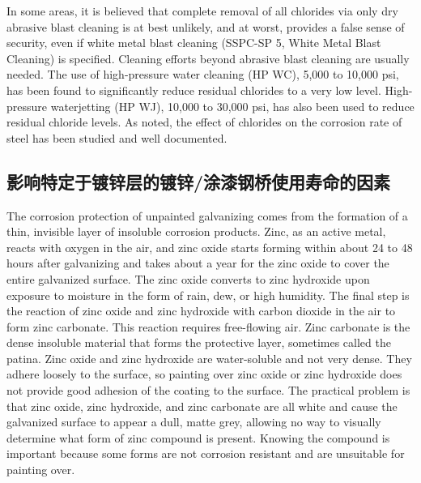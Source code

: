 In some areas, it is believed that complete removal of all chlorides via only dry abrasive blast cleaning is at best
unlikely, and at worst, provides a false sense of security, even if white metal blast cleaning (SSPC-SP 5, White
Metal Blast Cleaning) is specified. Cleaning efforts beyond abrasive blast cleaning are usually needed. The use of
high-pressure water cleaning (HP WC), 5,000 to 10,000 psi, has been found to significantly reduce residual chlorides
to a very low level. High-pressure waterjetting (HP WJ), 10,000 to 30,000 psi, has also been used to reduce residual
chloride levels. As noted, the effect of chlorides on the corrosion rate of steel has been studied and well documented.

\subsection{影响特定于镀锌层的镀锌/涂漆钢桥使用寿命的因素}
The corrosion protection of unpainted galvanizing comes from the formation of a thin, invisible layer of
insoluble corrosion products. Zinc, as an active metal, reacts with oxygen in the air, and zinc oxide starts forming
within about 24 to 48 hours after galvanizing and takes about a year for the zinc oxide to cover the entire galvanized
surface. The zinc oxide converts to zinc hydroxide upon exposure to moisture in the form of rain, dew, or high
humidity. The final step is the reaction of zinc oxide and zinc hydroxide with carbon dioxide in the air to form zinc
carbonate. This reaction requires free-flowing air. Zinc carbonate is the dense insoluble material that forms the
protective layer, sometimes called the patina. Zinc oxide and zinc hydroxide are water-soluble and not very dense.
They adhere loosely to the surface, so painting over zinc oxide or zinc hydroxide does not provide good adhesion of
the coating to the surface. The practical problem is that zinc oxide, zinc hydroxide, and zinc carbonate are all white
and cause the galvanized surface to appear a dull, matte grey, allowing no way to visually determine what form of zinc compound is present. Knowing the compound is important because some forms are not corrosion resistant and
are unsuitable for painting over.

